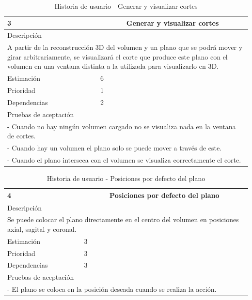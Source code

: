 \begin{table}[H]
	\begin{center}
		\begin{tabular} {|l|c|l|}
			\hline
			3 & \multicolumn{2}{c|}{Generar y visualizar cortes} \\ \hline \hline
			\multicolumn{3}{|l|}{Descripción} \\ \hline
			\multicolumn{3}{|p{12cm}|}{A partir de la reconstrucción 3D del volumen y un plano que se podrá mover y girar arbitrariamente, se visualizará el corte que produce este plano con el volumen en una ventana distinta a la utilizada para visualizarlo en 3D.} \\ \hline
			\multicolumn{2}{|l|}{Estimación} & 6 \\ \hline
			\multicolumn{2}{|l|}{Prioridad} & 1 \\ \hline
			\multicolumn{2}{|l|}{Dependencias} & 2 \\ \hline
			\multicolumn{3}{|l|}{Pruebas de aceptación} \\ \hline
			\multicolumn{3}{|p{12cm}|}{ - Cuando no hay ningún volumen cargado no se visualiza nada en la ventana de cortes.} \\ 
			\multicolumn{3}{|p{12cm}|}{ - Cuando hay un volumen el plano solo se puede mover a través de este.} \\ 
			\multicolumn{3}{|p{12cm}|}{ - Cuando el plano interseca con el volumen se visualiza correctamente el corte.} \\ \hline
		\end{tabular}
	\end{center}
	\caption{Historia de usuario - Generar y visualizar cortes}
	\label{tab:hu_generar_y_visualizar_cortes}
\end{table}

\begin{table}[H]
	\begin{center}
		\begin{tabular} {|l|c|l|}
			\hline
			4 & \multicolumn{2}{c|}{Posiciones por defecto del plano} \\ \hline \hline
			\multicolumn{3}{|l|}{Descripción} \\ \hline
			\multicolumn{3}{|p{12cm}|}{Se puede colocar el plano directamente en el centro del volumen en posiciones axial, sagital y coronal.} \\ \hline
			\multicolumn{2}{|l|}{Estimación} & 3 \\ \hline
			\multicolumn{2}{|l|}{Prioridad} & 3 \\ \hline
			\multicolumn{2}{|l|}{Dependencias} & 3 \\ \hline
			\multicolumn{3}{|l|}{Pruebas de aceptación} \\ \hline
			\multicolumn{3}{|p{12cm}|}{ - El plano se coloca en la posición deseada cuando se realiza la acción.} \\ \hline
		\end{tabular}
	\end{center}
	\caption{Historia de usuario - Posiciones por defecto del plano}
	\label{tab:hu_posiciones_por_defecto_del_plano}
\end{table}

